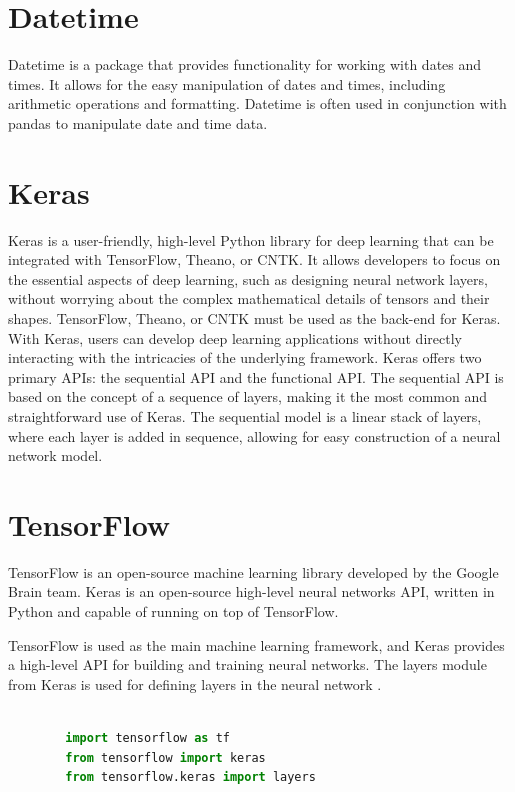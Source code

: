 		\section{Datetime}
	
	Datetime is a package that provides functionality for working with dates and times. It allows for the easy manipulation of dates and times, including arithmetic operations and formatting. Datetime is often used in conjunction with pandas to manipulate date and time data.
	
	\section{Keras}
	
	Keras is a user-friendly, high-level Python library for deep learning that can be integrated with TensorFlow, Theano, or CNTK. It allows developers to focus on the essential aspects of deep learning, such as designing neural network layers, without worrying about the complex mathematical details of tensors and their shapes. TensorFlow, Theano, or CNTK must be used as the back-end for Keras. With Keras, users can develop deep learning applications without directly interacting with the intricacies of the underlying framework.
	Keras offers two primary APIs: the sequential API and the functional API. The sequential API is based on the concept of a sequence of layers, making it the most common and straightforward use of Keras. The sequential model is a linear stack of layers, where each layer is added in sequence, allowing for easy construction of a neural network model.
	
		\section{TensorFlow}
	
	TensorFlow is an open-source machine learning library developed by the Google Brain team. Keras is an open-source high-level neural networks API, written in Python and capable of running on top of TensorFlow.
	
	TensorFlow is used as the main machine learning framework, and Keras provides a high-level API for building and training neural networks. The layers module from Keras is used for defining layers in the neural network \cite{TensorFlow:2023}.
	
	\begin{lstlisting}[language=Python]
		
		import tensorflow as tf
		from tensorflow import keras
		from tensorflow.keras import layers
		
	\end{lstlisting}
	
